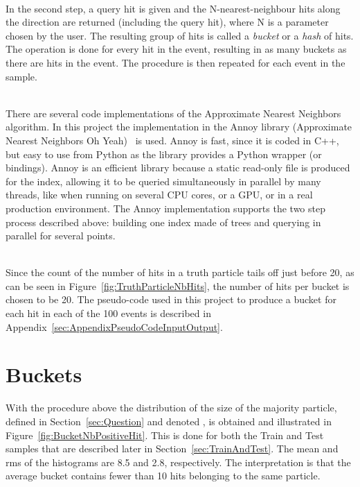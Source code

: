 \ \\In the second step, a query hit is given and the N-nearest-neighbour hits along the direction are returned (including the query hit), where N is a parameter chosen by the user. The resulting group of hits is called a \emph{bucket} or a \emph{hash} of hits. The operation is done for every hit in the event, resulting in as many buckets as there are hits in the event. The procedure is then repeated for each event in the sample.

\ \\There are several code implementations of the Approximate Nearest Neighbors algorithm. In this project the implementation in the Annoy library (Approximate Nearest Neighbors Oh Yeah)~\cite{Annoy} is used. Annoy is fast, since it is coded in C++, but easy to use from Python as the library provides a Python wrapper (or bindings). Annoy is an efficient library because a static read-only file is produced for the index, allowing it to be queried simultaneously in parallel by many threads, like when running on several CPU cores, or a GPU, or in a real production environment. The Annoy implementation supports the two step process described above: building one index made of trees and querying in parallel for several points.

\ \\Since the count of the number of hits in a truth particle tails off just before 20, as can be seen in Figure~\ref{fig:TruthParticleNbHits}, the number of hits per bucket is chosen to be 20. The pseudo-code used in this project to produce a bucket for each hit in each of the 100 events is described in Appendix~\ref{sec:AppendixPseudoCodeInputOutput}.

\section{Buckets}
\label{sec:Buckets}

With the procedure above the distribution of the size of the majority particle, defined in Section~\ref{sec:Question} and denoted \nbPositiveHit, is obtained and illustrated in Figure~\ref{fig:BucketNbPositiveHit}. This is done for both the Train and Test samples that are described later in Section~\ref{sec:TrainAndTest}. The mean and rms of the histograms are 8.5 and 2.8, respectively. The interpretation is that the average bucket contains fewer than 10 hits belonging to the same particle.  

